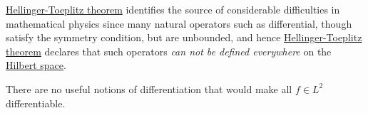 \hyperref[thm:Hellinger-Toeplitz]{Hellinger-Toeplitz theorem} identifies the source of considerable difficulties in mathematical physics since many natural operators such as differential, though satisfy the symmetry condition, but are unbounded, and hence \hyperref[thm:Hellinger-Toeplitz]{Hellinger-Toeplitz theorem} declares that such operators \emph{can not be defined everywhere} on the \hyperref[def:Hilbert-space]{Hilbert space}.

\begin{eg}
	There are no useful notions of differentiation that would make all \(f\in L^2\) differentiable.
\end{eg}